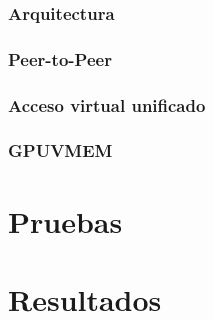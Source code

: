 \subsection{Arquitectura}
\subsection{Peer-to-Peer}
\subsection{Acceso virtual unificado}
\subsection{GPUVMEM}

\chapter{Pruebas}
\label{cap:pruebas}

\chapter{Resultados}
\label{cap:resultados}